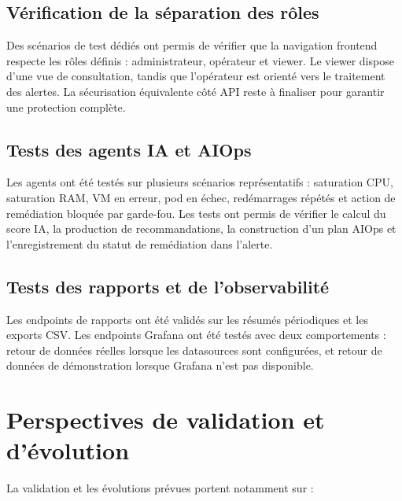\documentclass[11pt,a4paper]{report}
\begin{document}
\subsection{Vérification de la séparation des rôles}

Des scénarios de test dédiés ont permis de vérifier que la navigation
frontend respecte les rôles définis : administrateur, opérateur et viewer. Le
viewer dispose d'une vue de consultation, tandis que l'opérateur est orienté
vers le traitement des alertes. La sécurisation équivalente côté API reste à
finaliser pour garantir une protection complète.

\subsection{Tests des agents IA et AIOps}

Les agents ont été testés sur plusieurs scénarios représentatifs : saturation
CPU, saturation RAM, VM en erreur, pod en échec, redémarrages répétés et
action de remédiation bloquée par garde-fou. Les tests ont permis de vérifier
le calcul du score IA, la production de recommandations, la construction d'un
plan AIOps et l'enregistrement du statut de remédiation dans l'alerte.

\subsection{Tests des rapports et de l'observabilité}

Les endpoints de rapports ont été validés sur les résumés périodiques et les
exports CSV. Les endpoints Grafana ont été testés avec deux comportements :
retour de données réelles lorsque les datasources sont configurées, et retour
de données de démonstration lorsque Grafana n'est pas disponible.

\section{Perspectives de validation et d'évolution}

La validation et les évolutions prévues portent notamment sur :
\end{document}
